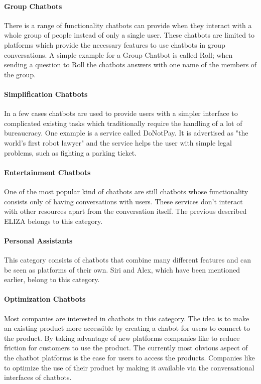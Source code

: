 \paragraph{Group Chatbots}

There is a range of functionality chatbots can provide when they interact with a whole group of people instead of only a single user. These chatbots are limited to platforms which provide the necessary features to use chatbots in group conversations. A simple example for a Group Chatbot is called Roll\cite{venturebeat}; when sending a question to Roll the chatbots answers with one name of the members of the group.


\paragraph{Simplification Chatbots}

In a few cases chatbots are used to provide users with a simpler interface to complicated existing tasks which traditionally require the handling of a lot of bureaucracy. One example is a service called DoNotPay. It is advertised as "the world’s first robot lawyer"\cite{oreilly} and the service helps the user with simple legal problems, such as fighting a parking ticket.


\paragraph{Entertainment Chatbots}

One of the most popular kind of chatbots are still chatbots whose functionality consists only of having conversations with users. These services don't interact with other resources apart from the conversation itself. The previous described ELIZA belongs to this category.


\paragraph{Personal Assistants}

This category consists of chatbots that combine many different features and can be seen as platforms of their own. Siri and Alex, which have been mentioned earlier, belong to this category.


\paragraph{Optimization Chatbots}

Most companies are interested in chatbots in this category. The idea is to make an existing product more accessible by creating a chabot for users to connect to the product. By taking advantage of new platforms companies like to reduce friction for customers to use the product. The currently most obvious aspect of the chatbot platforms is the ease for users to access the products. Companies like to optimize the use of their product by making it available via the conversational interfaces of chatbots.
\\

